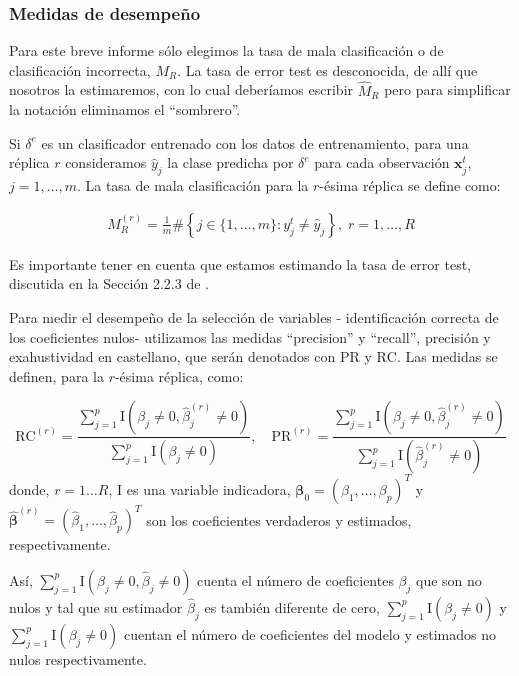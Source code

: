 \documentclass{report}
\begin{document}
\subsubsection*{Medidas de desempeño}

Para este breve informe sólo elegimos la tasa de mala clasificación  o de clasificación incorrecta, $M_R$.  La tasa de error test es desconocida, de allí que nosotros la estimaremos, con lo cual deberíamos escribir $\widehat{M}_R$ pero para simplificar la notación eliminamos el ``sombrero''.

Si $\delta^{e}$ es un clasificador entrenado con los datos de entrenamiento, para una réplica $r$ consideramos $\widehat{y}_j$ la clase predicha por  $\delta^{e}$ para cada observación $\mathbf{x}_j^{t}$, $j=1,\ldots,m$.  La tasa de mala clasificación  para la $r$-ésima réplica se define como:

\begin{eqnarray}\label{tasaentremuestr}
	M_R^{(r)}=\frac 1m \# \left\{  {j\in \{1,\ldots,m \}: y_j^{t}\neq \widehat{y}_j }	\right\},\; r=1,\ldots, R
\end{eqnarray}

Es importante tener en cuenta que estamos estimando la tasa de error test, discutida en la Sección 2.2.3 de \citep{james2021}. 


Para medir el desempeño de la selección de variables - identificación correcta de los coeficientes nulos- utilizamos las medidas ``precision'' y ``recall'', precisión y exahustividad en castellano,   que serán denotados con $\mathrm{PR}$ y $\mathrm{RC}$.  Las medidas se definen,  para la $r$-ésima réplica, como:


$$
\mathrm{RC}^{(r)}=\frac{\sum_{j=1}^p \text{I}\left(\beta_j \neq 0, \hat{\beta}_j^{(r)} \neq 0\right)}{\sum_{j=1}^p  \text{I}\left(\beta_j \neq 0\right)}, \quad \mathrm{PR}^{(r)}=\frac{\sum_{j=1}^p \text{I}\left(\beta_j \neq 0, \hat{\beta}_j^{(r)} \neq 0\right)}{\sum_{j=1}^p \text{I}\left(\hat{\beta}_j^{(r)} \neq 0\right)}
$$
donde, $r=1\ldots R$, I es una variable indicadora,  $\boldsymbol{\beta}_0=\left(\beta_1, \ldots, \beta_p\right)^T$ y  $\hat{\boldsymbol{\beta}}^{(r)}=\left(\hat{\beta}_1, \ldots, \hat{\beta}_p\right)^T $ son los coeficientes verdaderos y  estimados, respectivamente.


Así, $\sum_{j=1}^p \text{I}\left(\beta_j \neq 0, \hat{\beta}_j \neq 0\right)$ cuenta el número de coeficientes $\beta_j$  que son no nulos y tal que su estimador $\hat{\beta}_j$ es también diferente de cero,  $\sum_{j=1}^p  \text{I}\left(\beta_j \neq 0\right)$ y $\sum_{j=1}^p  \text{I}\left(\beta_j \neq 0\right)$ cuentan el número de coeficientes del modelo  y estimados no nulos respectivamente.
\end{document}

